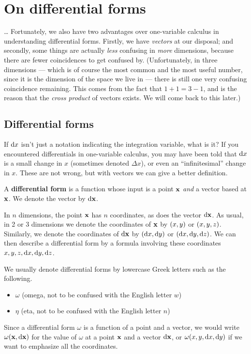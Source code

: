 \ifdefined\inmaster\else\def\subonly{\jobname}\fi

\chapter{On differential forms}
\label{cha:on-forms}

\dots
Fortunately, we also have two advantages over one-variable calculus in understanding differential forms.
Firstly, we have \emph{vectors} at our disposal; and secondly, some things are actually \emph{less} confusing in \emph{more} dimensions, because there are fewer coincidences to get confused by.
(Unfortunately, in three dimensions --- which is of course the most common and the most useful number, since it is the dimension of the space we live in --- there is still one very confusing coincidence remaining.
This comes from the fact that $1+1=3-1$, and is the reason that the \emph{cross product} of vectors exists.
We will come back to this later.)

\section{Differential forms}
\label{sec:differential-forms}

If ${\mathrm{d} x}$ isn't just a notation indicating the integration variable, what is it?
If you encountered differentials in one-variable calculus, you may have been told that ${\mathrm{d} x}$ is a small change in $x$ (sometimes denoted $\Delta x$), or even an ``infinitesimal'' change in $x$.
These are not wrong, but with vectors we can give a better definition.

\begin{defn}
  A \textbf{differential form} is a function whose input is a point $\mathbf{x}$ \emph{and} a vector based at $\mathbf{x}$.
  We denote the vector by ${\mathrm{d} \mathbf{x}}$.
\end{defn}

In $n$ dimensions, the point $\mathbf{x}$ has $n$ coordinates, as does the vector ${\mathrm{d} \mathbf{x}}$.
As usual, in 2 or 3 dimensions we denote the coordinates of $\mathbf{x}$ by $(x,y)$ or $(x,y,z)$.
Similarly, we denote the coordinates of ${\mathrm{d} \mathbf{x}}$ by $({\mathrm{d} x},{\mathrm{d} y})$ or $({\mathrm{d} x},{\mathrm{d} y},{\mathrm{d} z})$.
We can then describe a differential form by a formula involving these coordinates $x,y,z,{\mathrm{d} x},{\mathrm{d} y},{\mathrm{d} z}$.

We usually denote differential forms by lowercase Greek letters such as the following.
\begin{itemize}
\item $\omega$ (omega, not to be confused with the English letter $w$)
\item $\eta$ (eta, not to be confused with the English letter $n$)
\end{itemize}
Since a differential form $\omega$ is a function of a point and a vector, we would write $\omega(\mathbf{x},{\mathrm{d} \mathbf{x}})$ for the value of $\omega$ at a point $\mathbf{x}$ and a vector ${\mathrm{d} \mathbf{x}}$, or $\omega(x,y,{\mathrm{d} x},{\mathrm{d} y})$ if we want to emphasize all the coordinates.

